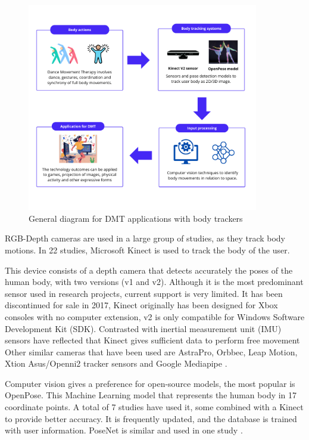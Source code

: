\documentclass[a4paper,fleqn]{cas-sc}
\begin{document}
\begin{figure}
	\includegraphics[width=0.9\textwidth]{fig-general-dmt-flow.png}
        \centering
	  \caption{General diagram for DMT applications with body trackers}\label{fig:general-dmt-app}
\end{figure}

RGB-Depth cameras are used in a large group of studies, as they track body motions. In 22 studies, Microsoft Kinect is used to track the body of the user. 

This device consists of a depth camera that detects accurately the poses of the human body, with two versions (v1 and v2). Although it is the most predominant sensor used in research projects, current support is very limited. It has been discontinued for sale in 2017, Kinect originally has been designed for Xbox consoles with no computer extension, v2 is only compatible for Windows Software Development Kit (SDK). Contrasted with inertial measurement unit (IMU) sensors have reflected that Kinect gives sufficient data to perform free movement \cite{Geminiani19} 
Other similar cameras that have been used are AstraPro, Orbbec, Leap Motion, Xtion Asus/Openni2 \cite{Chevalier17} tracker sensors and Google Mediapipe \cite{DeCarolis21}.

Computer vision gives a preference for open-source models, the most popular is OpenPose. This Machine Learning model that represents the human body in 17 coordinate points. A total of 7 studies have used it, some combined with a Kinect to provide better accuracy. It is frequently updated, and the database is trained with user information. PoseNet is similar and used in one study \cite{Pohl20}.
\end{document}

